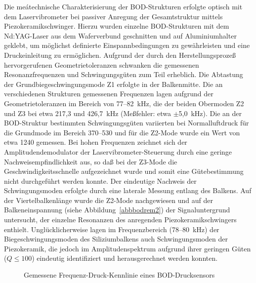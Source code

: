 Die meátechnische Charakterisierung der BOD-Strukturen erfolgte optisch mit
dem Laservibrometer bei passiver Anregung der Gesamtstruktur mittels
Piezokeramikschwinger. Hierzu wurden einzelne BOD-Strukturen mit dem
Nd:YAG-Laser aus dem Waferverbund geschnitten und auf Aluminiumhalter
geklebt, um möglichst definierte Einspannbedingungen zu gewährleisten und
eine Druckeinleitung zu ermöglichen. Aufgrund der durch den
Herstellungsprozeß hervorgerufenen Geometrietoleranzen schwanken die
gemessenen Resonanzfrequenzen und Schwingungsgüten zum Teil erheblich. Die
Abtastung der Grundbiegeschwingungsmode Z1 erfolgte in der Balkenmitte.
Die an verschiedenen Strukturen gemessenen Frequenzen lagen aufgrund der
Geometrietoleranzen im Bereich von
77--82~kHz, die der beiden Obermoden Z2 und Z3 bei etwa 217,3 und
426,7~kHz (Meßfehler: etwa $\pm$5,0~kHz). Die an der BOD-Struktur
bestimmten Schwingungsgüten variierten bei Normalluftdruck für die
Grundmode im Bereich 370--530 und für die Z2-Mode wurde ein Wert von
etwa 1240 gemessen. Bei hohen Frequenzen zeichnet sich der
Amplitudendemodulator der Laservibrometer-Steuerung durch eine geringe
Nachweisempfindlichkeit aus, so daß bei der Z3-Mode die
Geschwindigkeitsschnelle aufgezeichnet wurde und somit eine Gütebestimmung
nicht durchgeführt werden konnte. Der eindeutige Nachweis der
Schwingungsmoden erfolgte durch eine laterale Messung entlang
des Balkens. Auf der Viertelbalkenlänge wurde die Z2-Mode nachgewiesen
und auf der Balkeneinspannung (siehe Abbildung~\ref{abbbodrem2}) der
Signaluntergrund untersucht, der einzelne Resonanzen des anregenden
Piezokeramikschwingers enthielt. Unglücklicherweise lagen im Frequenzbereich
(78--80~kHz) der Biegeschwingungsmoden
des Siliziumbalkens auch Schwingungsmoden der Piezokeramik, die jedoch
im Amplitudenspektrum aufgrund ihrer geringen Güten ($Q \leq 100$) eindeutig
identifiziert und herausgerechnet werden konnten.\\
\begin{figure}[htb]

\begin{center}

\setabbmm
\end{center}
\caption{\label{abbbodkennlinie}
 Gemessene Frequenz-Druck-Kennlinie eines BOD-Drucksensors}
\end{figure}
